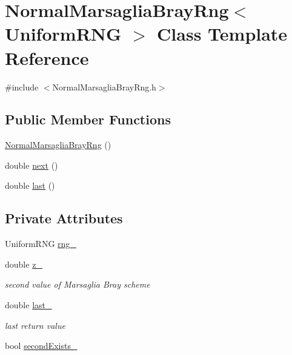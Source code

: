 \hypertarget{class_normal_marsaglia_bray_rng}{}\section{Normal\+Marsaglia\+Bray\+Rng$<$ Uniform\+R\+NG $>$ Class Template Reference}
\label{class_normal_marsaglia_bray_rng}


{\ttfamily \#include $<$Normal\+Marsaglia\+Bray\+Rng.\+h$>$}

\subsection*{Public Member Functions}
\begin{DoxyCompactItemize}
\item 
\hyperlink{class_normal_marsaglia_bray_rng_a4d225dedc26e6dcf154a2902827b2ede}{Normal\+Marsaglia\+Bray\+Rng} ()
\item 
double \hyperlink{class_normal_marsaglia_bray_rng_a2cc54f5f331a5bd71eedc67c84db7279}{next} ()
\item 
double \hyperlink{class_normal_marsaglia_bray_rng_af90ac458fcbf302dfad98816132658c2}{last} ()
\end{DoxyCompactItemize}
\subsection*{Private Attributes}
\begin{DoxyCompactItemize}
\item 
Uniform\+R\+NG \hyperlink{class_normal_marsaglia_bray_rng_a590b5bfbb3888d5163c6e3d702bfb2e0}{rng\+\_\+}
\item 
double \hyperlink{class_normal_marsaglia_bray_rng_a6d021a285cd0eb2d95c25cdb8af0ee93}{z\+\_\+}
\begin{DoxyCompactList}\small\item\em second value of Marsaglia Bray scheme \end{DoxyCompactList}\item 
double \hyperlink{class_normal_marsaglia_bray_rng_a39a4a809c38812b344b3695b915133c6}{last\+\_\+}
\begin{DoxyCompactList}\small\item\em last return value \end{DoxyCompactList}\item 
bool \hyperlink{class_normal_marsaglia_bray_rng_a6b795b729e795b1b81aa1b30d5dfe8ef}{second\+Exists\+\_\+}
\end{DoxyCompactItemize}


